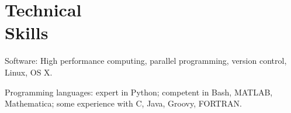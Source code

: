 \section{\sc Technical\\Skills} %
\begin{list2}
\item Software: High performance computing, parallel programming, version control, Linux, OS X.
\item Programming languages: expert in Python; competent in Bash, MATLAB, Mathematica; some experience with C, Java, Groovy, FORTRAN.
\end{list2}

